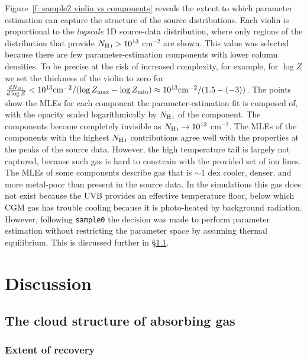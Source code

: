 \documentclass[fleqn,usenatbib]{mnras}
\begin{document}
Figure~\ref{f: sample2 violin vs components} reveals the extent to which parameter estimation can capture the structure of the source distributions.
Each violin is proportional to the \textit{logscale} 1D source-data distribution,
where only regions of the distribution that provide $N_{\ion{H}{I}} > 10^{13}$ cm$^{-2}$ are shown.
This value was selected because there are few parameter-estimation components with lower column densities.
To be precise at the risk of increased complexity,
for example, for $\log Z$ we set the thickness of the violin to zero for $\frac{dN_{\ion{H}{I}}}{d\log Z} < 10^{13} {\rm cm}^{-2} / (\log Z_{\rm max} - \log Z_{\rm min} ) \approx 10^{13} {\rm cm}^{-2} / ( 1.5 - (-3) )$.
The points show the MLEs for each component the parameter-estimation fit is composed of,
with the opacity scaled logarithmically by $N_{\ion{H}{I}}$ of the component.
The components become completely invisible as $N_{\ion{H}{I}} \rightarrow 10^{13}$ cm$^{-2}$.
The MLEs of the components with the highest $N_{\ion{H}{I}}$ contributions agree well with the properties at the peaks of the source data.
However, the high temperature tail is largely not captured, because such gas is hard to constrain with the provided set of ion lines.
The MLEs of some components describe gas that is $\sim 1$ dex cooler, denser, and more metal-poor than present in the source data.
In the simulations this gas does not exist because the UVB provides an effective temperature floor,
below which CGM gas has trouble cooling because it is photo-heated by background radiation.
However, following \texttt{sample0} the decision was made to perform parameter estimation without restricting the parameter space by assuming thermal equilibrium.
This is discussed further in \S\ref{s: discussion -- cloud structure}.

\section{Discussion}
\label{s: discussion}

\subsection{The cloud structure of absorbing gas}
\label{s: discussion -- cloud structure}

\subsubsection{Extent of recovery}
\label{s: discussion -- cloud structure -- recovery}
\end{document}
